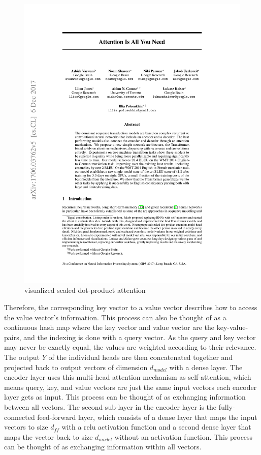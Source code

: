 \documentclass[draft,final]{vutinfth} %
\begin{document}
    \begin{figure}[H]
        \centering{}
        \includegraphics[page=4,width=0.8\linewidth,trim={140 552 145 72},clip]{literature/attention_is_all_you_need.pdf}
        \caption{visualized scaled dot-product attention \cite[p. 4]{Transformer}}
        \label{fig:sdpa_vis}
    \end{figure}
    Therefore, the corresponding key vector to a value vector describes how to access the value vector's information.
    This process can also be thought of as a continuous hash map where the key vector and value vector are the key-value-pairs, and the indexing is done with a query vector.
    As the query and key vector may never be exactly equal, the values are weighted according to their relevance.
    The output $Y$ of the individual heads are then concatenated together and projected back to output vectors of dimension $d_{model}$ with a dense layer.
    The encoder layer uses this multi-head attention mechanism as self-attention, which means query, key, and value vectors are just the same input vectors each encoder layer gets as input.
    This process can be thought of as exchanging information between all vectors.
    The second sub-layer in the encoder layer is the fully-connected feed-forward layer, which consists of a dense layer that maps the input vectors to size $d_{ff}$ with a relu activation function and a second dense layer that maps the vector back to size $d_{model}$ without an activation function.
    This process can be thought of as exchanging information within all vectors.
\end{document}
